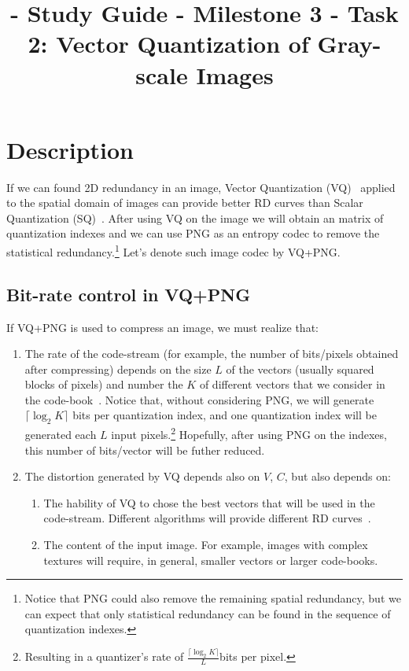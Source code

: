

\title{\SM{} - Study Guide - Milestone 3 - Task 2: Vector Quantization of Gray-scale Images}

\maketitle
\tableofcontents

\section{Description}

If we can found 2D redundancy in an image, Vector Quantization
(VQ)~\cite{vruiz__vector_quantization} applied to the spatial domain
of images can provide better RD curves than Scalar Quantization
(SQ)~\cite{vruiz__scalar_quantization}. After using VQ on the image we
will obtain an matrix of quantization indexes and we can use PNG as an
entropy codec to remove the statistical redundancy.\footnote{Notice
that PNG could also remove the remaining spatial redundancy, but we
can expect that only statistical redundancy can be found in the
sequence of quantization indexes.} Let's denote such image codec by
VQ+PNG.


\subsection{Bit-rate control in VQ+PNG}

If VQ+PNG is used to compress an image, we must realize that:
\begin{enumerate}
\item The rate of the code-stream (for example, the number of
  bits/pixels obtained after compressing) depends on the size $L$ of
  the vectors (usually squared blocks of pixels) and number the $K$ of
  different vectors that we consider in the
  code-book~\cite{vruiz__vector_quantization}. Notice that, without
  considering PNG, we will generate $\lceil\log_2 K\rceil$ bits per
  quantization index, and one quantization index will be generated
  each $L$ input pixels.\footnote{Resulting in a quantizer's rate of
  $\frac{\lceil\log_2 K\rceil}{L}$bits per pixel.} Hopefully, after
  using PNG on the indexes, this number of bits/vector will be futher
  reduced.
\item The distortion generated by VQ depends also on $V$, $C$, but
  also depends on:
  \begin{enumerate}
  \item The hability of VQ to chose the best vectors that will be used
    in the code-stream. Different algorithms will provide different RD
    curves~\cite{vruiz__information_theory}.
  \item The content of the input image. For example, images with
    complex textures will require, in general, smaller vectors or
    larger code-books.
  \end{enumerate}
\end{enumerate}

